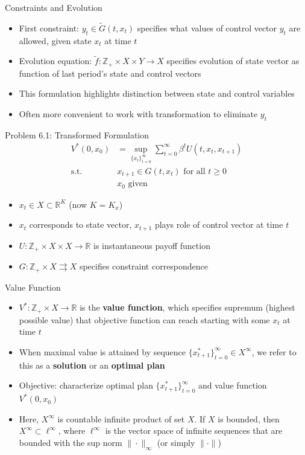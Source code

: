 \documentclass[9pt,aspectratio=169]{beamer}
\newcommand{\R}{\mathbb{R}}
\newcommand{\Z}{\mathbb{Z}}
\begin{document}
\begin{frame}{Constraints and Evolution}
    \begin{itemize}
        \item First constraint: $y_t \in \tilde{G}(t, x_t)$ specifies what
        values of control vector $y_t$ are allowed, given state $x_t$ at time
        $t$
        \item Evolution equation: $\tilde{f}: \Z_+ \times X \times Y \to X$
        specifies evolution of state vector as function of last period's
        state and control vectors
        \item This formulation highlights distinction between state and control variables
        \item Often more convenient to work with transformation to eliminate $y_t$
    \end{itemize}
\end{frame}

\begin{frame}{Problem 6.1: Transformed Formulation}
    \begin{align*}
        V^*(0, x_0) &= \sup_{\{x_t\}_{t=0}^{\infty}}
        \sum_{t=0}^{\infty} \beta^t U(t, x_t, x_{t+1})\\ 
        \text{s.t. } &x_{t+1} \in G(t, x_t) \text{ for all } t \geq 0\\
        &x_0 \text{ given}
    \end{align*}
    \begin{itemize}
        \item $x_t \in X \subset \R^K$ (now $K = K_x$)
        \item $x_t$ corresponds to state vector, $x_{t+1}$ plays role of control vector at time $t$
        \item $U: \Z_+ \times X \times X \to \R$ is instantaneous payoff function
        \item $G: \Z_+ \times X \rightrightarrows X$ specifies constraint correspondence
    \end{itemize}
\end{frame}

\begin{frame}{Value Function}
\begin{itemize}
    \item $V^*: \Z_+ \times X \to \R$ is the \textbf{value function}, which
    specifies supremum (highest possible value) that objective function can
    reach starting with some $x_t$ at time $t$
    \item When maximal value is attained by sequence
    $\{x^*_{t+1}\}_{t=0}^{\infty} \in X^{\infty}$, we refer to this as a
    \textbf{solution} or an \textbf{optimal plan}
    \item Objective: characterize optimal plan $\{x^*_{t+1}\}_{t=0}^{\infty}$
    and value function $V^*(0, x_0)$
    \item Here, $X^{\infty}$ is countable infinite product of set $X$. If
    $X$ is bounded, then $X^{\infty} \subset \ell^{\infty}$, where
    $\ell^{\infty}$ is the vector space of infinite sequences that are bounded
    with the sup norm $\|\cdot\|_{\infty}$ (or simply $\|\cdot\|$)
\end{itemize}
\end{frame}
\end{document}

